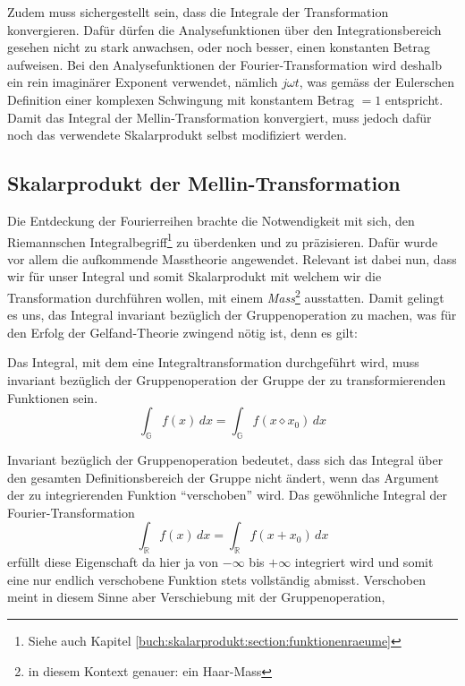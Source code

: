 Zudem muss sichergestellt sein, dass die Integrale der Transformation konvergieren.
Dafür dürfen die Analysefunktionen über den Integrationsbereich gesehen nicht zu 
stark anwachsen, oder noch besser, einen konstanten Betrag aufweisen. 
Bei den Analysefunktionen der Fourier-Transformation wird deshalb ein rein 
imaginärer Exponent verwendet, nämlich $j\omega t$, was gemäss der Eulerschen 
Definition einer komplexen Schwingung mit konstantem Betrag $= 1$ entspricht.
Damit das Integral der Mellin-Transformation konvergiert, muss jedoch dafür 
noch das verwendete Skalarprodukt selbst modifiziert werden.


\subsection{Skalarprodukt der Mellin-Transformation
\label{mellin:subsection:skalarprodukt}}
Die Entdeckung der Fourierreihen brachte die Notwendigkeit mit sich, den 
Riemannschen Integralbegriff\footnote{Siehe auch Kapitel 
\ref{buch:skalarprodukt:section:funktionenraeume}} zu überdenken und zu 
präzisieren.
Dafür wurde vor allem die aufkommende Masstheorie angewendet.
Relevant ist dabei nun, dass wir für unser Integral und somit Skalarprodukt 
mit welchem wir die Transformation durchführen wollen, 
mit einem {\em Mass}\footnote{in diesem Kontext genauer: ein Haar-Mass} 
ausstatten. 
Damit gelingt es uns, das Integral 
invariant bezüglich der Gruppenoperation zu machen, was für den 
Erfolg der Gelfand-Theorie zwingend nötig ist, denn es gilt:
\begin{definition}
    Das Integral, mit dem eine Integraltransformation durchgeführt wird, 
    muss invariant bezüglich der Gruppenoperation der Gruppe 
    der zu transformierenden Funktionen sein.
    \[
        \int_\mathbb{G} f(x)\,{d}x 
        = \int_\mathbb{G} f(x \diamond x_0)\,{d}x
    \]
\end{definition}
Invariant bezüglich der Gruppenoperation bedeutet, dass sich das Integral 
über den gesamten Definitionsbereich der Gruppe nicht ändert, wenn das 
Argument der zu integrierenden Funktion ``verschoben'' wird. 
Das gewöhnliche Integral der Fourier-Transformation 
\begin{equation}
    \int_\mathbb{R} f(x)\,{d}x 
    = \int_\mathbb{R} f(x + x_0)\,{d}x
\end{equation}
erfüllt diese Eigenschaft 
da hier ja von $-\infty$ bis $+\infty$ integriert wird und somit eine nur 
endlich verschobene Funktion stets vollständig abmisst.
Verschoben meint in diesem Sinne aber Verschiebung mit der Gruppenoperation, 
